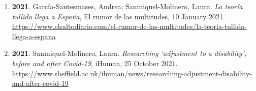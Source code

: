 \begin{enumerate}
\item {\bf 2021}. García-Santesmases, Andrea; Sanmiquel-Molinero, Laura. {\it La teoría tullida llega a España}, El rumor de las multitudes, 10 January 2021. \\ \url{ https://www.elsaltodiario.com/el-rumor-de-las-multitudes/la-teoria-tullida-llega-a-espana }\filbreak
\item {\bf 2021}. Sanmiquel-Molinero, Laura. {\it Researching ‘adjustment to a disability’, before and after Covid-19}, iHuman, 25 October 2021. \\ \url{ https://www.sheffield.ac.uk/ihuman/news/researching-adjustment-disability-and-after-covid-19 }\filbreak
\end{enumerate} 
